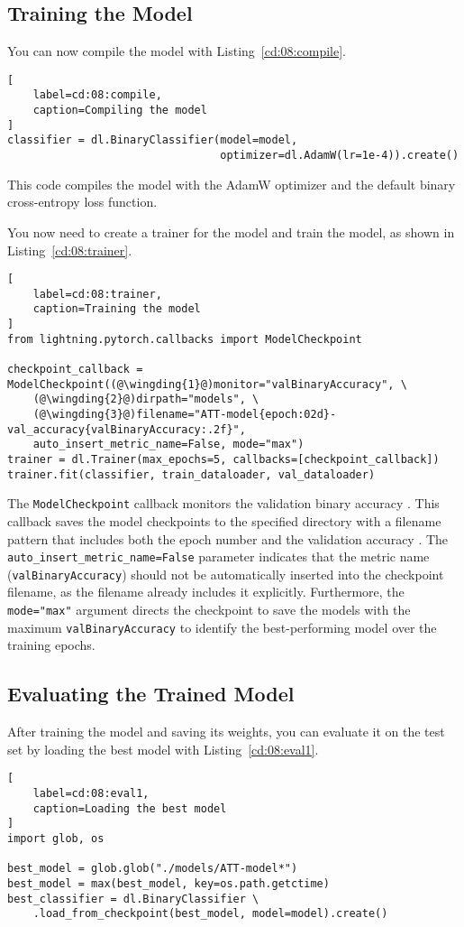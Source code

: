 \subsection{Training the Model}

You can now compile the model with Listing~\ref{cd:08:compile}.
\begin{lstlisting}[
    label=cd:08:compile,
    caption=Compiling the model
]
classifier = dl.BinaryClassifier(model=model, 
                                 optimizer=dl.AdamW(lr=1e-4)).create()
\end{lstlisting}
This code compiles the model with the AdamW optimizer and the default binary cross-entropy loss function.

You now need to create a trainer for the model and train the model, as shown in Listing~\ref{cd:08:trainer}.
\begin{lstlisting}[
    label=cd:08:trainer,
    caption=Training the model
]
from lightning.pytorch.callbacks import ModelCheckpoint

checkpoint_callback = ModelCheckpoint((@\wingding{1}@)monitor="valBinaryAccuracy", \
    (@\wingding{2}@)dirpath="models", \
    (@\wingding{3}@)filename="ATT-model{epoch:02d}-val_accuracy{valBinaryAccuracy:.2f}",
    auto_insert_metric_name=False, mode="max")
trainer = dl.Trainer(max_epochs=5, callbacks=[checkpoint_callback])
trainer.fit(classifier, train_dataloader, val_dataloader)
\end{lstlisting}
The \lstinline{ModelCheckpoint} callback monitors the validation binary accuracy . This callback saves the model checkpoints to the specified directory  with a filename pattern that includes both the epoch number and the validation accuracy . 
The \lstinline{auto_insert_metric_name=False} parameter indicates that the metric name (\lstinline{valBinaryAccuracy}) should not be automatically inserted into the checkpoint filename, as the filename already includes it explicitly. 
Furthermore, the \lstinline{mode="max"} argument directs the checkpoint to save the models with the maximum \lstinline{valBinaryAccuracy} to identify the best-performing model over the training epochs.

\subsection{Evaluating the Trained Model}

After training the model and saving its weights, you can evaluate it on the test set by loading the best model with Listing~\ref{cd:08:eval1}. 
\begin{lstlisting}[
    label=cd:08:eval1,
    caption=Loading the best model
]
import glob, os

best_model = glob.glob("./models/ATT-model*")
best_model = max(best_model, key=os.path.getctime)
best_classifier = dl.BinaryClassifier \
    .load_from_checkpoint(best_model, model=model).create()
\end{lstlisting}

